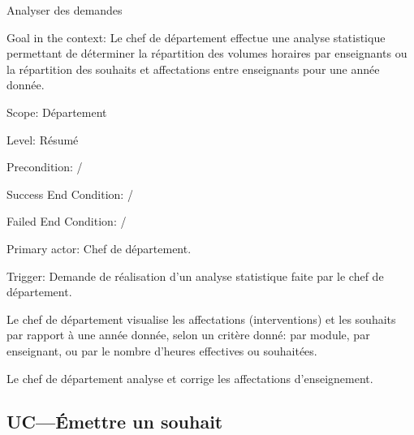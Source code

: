 \begin{ocl}
\begin{usecase}{Analyser des demandes}\label{usecase:analyse}

\begin{information}
	

\item[Goal in the context:] Le chef de département effectue une analyse statistique permettant de déterminer la répartition des volumes horaires par enseignants ou la répartition des souhaits et affectations entre enseignants pour une année donnée. 

\item[Scope:] Département

\item[{Level:}] Résumé

\item[{Precondition:}]
 /

 \item[Success End Condition:]
/

 \item[Failed End Condition:]
 /

 \item[Primary actor:]
 Chef de département.

 \item[Trigger:]
 Demande de réalisation d'un analyse statistique faite par le chef de département.\\
\end{information}

\begin{scenario}
	\item Le chef de département visualise les affectations (interventions) et les souhaits par rapport à une année donnée, selon un critère donné: par module, par enseignant, ou par le nombre d'heures effectives ou souhaitées.
	\item Le chef de département analyse et corrige les affectations d'enseignement.
\end{scenario}

\end{usecase}

\subsection{UC---Émettre un souhait}


\end{ocl}
